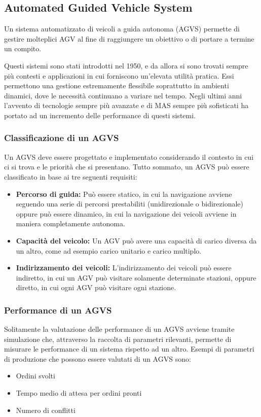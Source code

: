\documentclass[12pt]{article}
\begin{document}
\newpage

\subsection{Automated Guided Vehicle System}
\noindent Un sistema automatizzato di veicoli a guida autonoma (AGVS) permette di gestire molteplici AGV al fine di raggiungere un obiettivo o di portare a termine un compito.

\noindent Questi sistemi sono stati introdotti nel 1950, e da allora si sono trovati sempre più contesti e applicazioni in cui forniscono un'elevata utilità pratica. Essi permettono una gestione estremamente flessibile soprattutto in ambienti dinamici, dove le necessità continuano a variare nel tempo. Negli ultimi anni l'avvento di tecnologie sempre più avanzate e di MAS sempre più sofisticati ha portato ad un incremento delle performance di questi sistemi.


\subsubsection{Classificazione di un AGVS}
Un AGVS deve essere progettato e implementato considerando il contesto in cui ci si trova e le priorità che si presentano. Tutto sommato, un AGVS può essere classificato in base ai tre seguenti requisiti:
\begin{itemize}
\item \textbf{Percorso di guida:} Può essere statico, in cui la navigazione avviene seguendo una serie di percorsi prestabiliti (unidirezionale o bidirezionale) oppure può essere dinamico, in cui la navigazione dei veicoli avviene in maniera completamente autonoma.

\item \textbf{Capacità del veicolo:} Un AGV può avere una capacità di carico diversa da un altro, come ad esempio carico unitario e carico multiplo.

\item \textbf{Indirizzamento dei veicoli:} L'indirizzamento dei veicoli può essere indiretto, in cui un AGV può visitare solamente determinate stazioni, oppure diretto, in cui ogni AGV può visitare ogni stazione.

\end{itemize}

\subsubsection{Performance di un AGVS}
Solitamente la valutazione delle performance di un AGVS avviene tramite simulazione che, attraverso la raccolta di parametri rilevanti, permette di misurare le performance di un sistema rispetto ad un altro. Esempi di parametri di produzione che possono essere valutati di un AGVS sono:
\begin{itemize}
\setlength\itemsep{0.1em}
    \item Ordini svolti
    \item Tempo medio di attesa per ordini pronti
    \item Numero di conflitti
\end{itemize}
\end{document}
